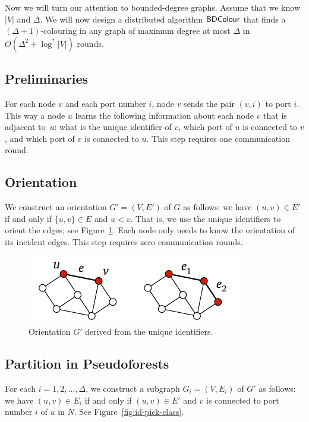 \label{sec:bdcolour}

Now we will turn our attention to bounded-degree graphs. Assume that we know $|V|$ and $\Delta$. We will now design a distributed algorithm $\textup{\sffamily BDColour}$ that finds a $(\Delta+1)$-colouring in any graph of maximum degree at most $\Delta$ in $O(\Delta^2 + \log^* |V|)$ rounds.

\subsection{Preliminaries}

For each node $v$ and each port number $i$, node $v$ sends the pair $(v, i)$ to port $i$. This way a node $u$ learns the following information about each node $v$ that is adjacent to~$u$: what is the unique identifier of $v$, which port of $u$ is connected to $v$, and which port of $v$ is connected to $u$. This step requires one communication round.

\subsection{Orientation}

We construct an orientation $G' = (V,E')$ of $G$ as follows: we have $(u,v) \in E'$ if and only if $\{u,v\} \in E$ and $u < v$. That is, we use the unique identifiers to orient the edges; see Figure~\ref{fig:id-orient}. Each node only needs to know the orientation of its incident edges. This step requires zero communication rounds.

\begin{figure}
    \centering
    \includegraphics[page=\PIdOrient]{figs.pdf}
    \caption{Orientation $G'$ derived from the unique identifiers.}\label{fig:id-orient}
\end{figure}


\subsection{Partition in Pseudoforests}

For each $i = 1,2,\dotsc,\Delta$, we construct a subgraph $G_i = (V,E_i)$ of $G'$ as follows: we have $(u,v) \in E_i$ if and only if $(u,v) \in E'$ and $v$ is connected to port number $i$ of $u$ in $N$. See Figure~\ref{fig:id-pick-class}.

